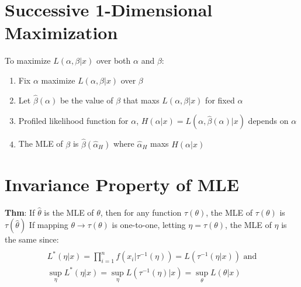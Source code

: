 \documentclass{article}
\newcommand{\B}{\beta}
\newcommand{\hth}{\hat{\theta}}
\newcommand{\prodn}{\prod_{i=1}^{n}}
\begin{document}
\section*{Successive 1-Dimensional Maximization}
To maximize $L(\alpha,\B|x)$ over both $\alpha$ and $\B$:
\begin{enumerate}
\item Fix $\alpha$ maximize $L(\alpha,\B|x)$ over $\B$
\item Let $\hat{\B}(\alpha)$ be the value of $\B$ that maxs $L(\alpha,\B|x)$ for fixed $\alpha$
\item Profiled likelihood function for $\alpha$, $H(\alpha|x)=L(\alpha,\hat{\B}(\alpha)|x)$ depends on $\alpha$
\item The MLE of $\B$ is $\hat{\B}(\hat{\alpha}_H)$ where $\hat{\alpha}_H$ maxs $H(\alpha|x)$
\end{enumerate}
\section*{Invariance Property of MLE}
\textbf{Thm}: If $\hth$ is the MLE of $\theta$, then for any function $\tau(\theta)$, the MLE of $\tau(\theta)$ is $\tau(\hth)$\medbreak
If mapping $\theta \to \tau(\theta)$ is one-to-one, letting $\eta=\tau(\theta)$, the MLE of $\eta$ is the same since:
\begin{multline*}\\
L^{*}(\eta|x)=\prodn f(x_i|\tau^{-1}(\eta))=L(\tau^{-1}(\eta|x))
\text{ and}\\ \sup_{\eta}L^*(\eta|x)=\sup_{\eta}L(\tau^{-1}(\eta)|x)=\sup_{\theta}L(\theta|x)\\
\end{multline*}
\end{document}

